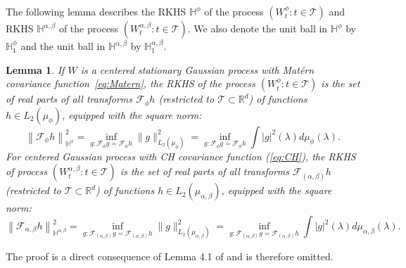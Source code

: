 \documentclass[ejs,noshowframe]{imsart}
\theoremstyle{plain}
\newtheorem{lemma}[theorem]{Lemma}
\theoremstyle{definition}
\theoremstyle{remark}
\begin{document}
The following lemma describes the RKHS $\mathbb{H}^{\phi}$ of the process $\left(W_t^{\phi}: t \in \mathcal{T}\right)$ and RKHS $\mathbb{H}^{\alpha,\beta}$ of the process $\left(W_t^{\alpha,\beta}: t \in \mathcal{T}\right)$. We also denote the unit ball in $\mathbb{H}^{\phi}$ by $\mathbb{H}_1^{\phi}$ and the unit ball in $\mathbb{H}^{\alpha,\beta}$ by $\mathbb{H}_1^{\alpha,\beta}$.
\begin{lemma} \label{rescaled measure}
   If  $W$ is a centered stationary Gaussian process with Mat\'ern covariance function~\eqref{eq:Matern}, the RKHS of the  process $\left(W_t^{\phi}:  t \in  \mathcal{T}\right)$ is the set of real parts of all transforms $\mathcal{F}_{\phi} h$ (restricted to  $ \mathcal{T} \subset \mathbb{R}^d$) of functions $h \in L_2\left(\mu_{\phi}\right)$, equipped with the square norm:
\begin{equation}\label{RKHS of rescaled matern}
\left\|\mathcal{F}_{\phi} h\right\|_{\mathbb{H}^{\phi}}^2 =\inf _{g: \mathcal{F}_{\phi} g=\mathcal{F}_{\phi} h} \|g\|_{L_2\left(\mu_{\phi}\right)}^2=\inf _{g: \mathcal{F}_{\phi} g=\mathcal{F}_{\phi} h}\int|g|^2(\lambda) d \mu_{\phi}(\lambda) .
\end{equation}
For centered Gaussian process with CH covariance function (\ref{eq:CH}),  the RKHS of process $\left(W_t^{\alpha,\beta}: t \in  \mathcal{T}\right)$  is the set of real parts of all transforms $\mathcal{F}_{(\alpha,\beta)} h$ (restricted to  $ \mathcal{T} \subset \mathbb{R}^d$) of functions $h \in L_2\left(\mu_{\alpha,\beta}\right)$, equipped with the square norm:
\begin{equation}\label{RKHS of rescaled CH}
\left\|\mathcal{F}_{\alpha,\beta} h\right\|_{\mathbb{H}^{\alpha,\beta}}^2 =\inf _{g: \mathcal{F}_{(\alpha,\beta)}  g=\mathcal{F}_{(\alpha,\beta)}  h} \|g\|_{L_2\left(  \mu_{\alpha,\beta}\right)}^2=\inf _{g: \mathcal{F}_{(\alpha,\beta)} g=\mathcal{F}_{(\alpha,\beta)}  h}\int|g|^2(\lambda) d \mu_{\alpha,\beta}(\lambda) .
\end{equation}
\end{lemma}
The proof is a direct consequence of  Lemma 4.1 of \cite{van2009adaptive} and is therefore omitted. 
\end{document}
